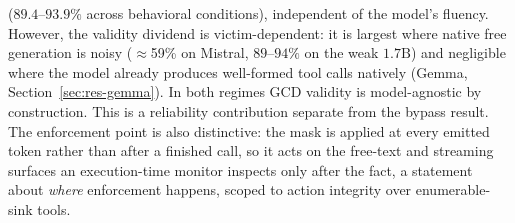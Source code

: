 (\(89.4\)--\(93.9\%\) across behavioral conditions), independent of the model's fluency. However, the validity dividend is victim-dependent: it is largest where native free generation is noisy (\(\approx\)59\% on Mistral, \(89\)--\(94\%\) on the weak \(1.7\mathrm{B}\)) and negligible where the model already produces well-formed tool calls natively (Gemma, Section~\ref{sec:res-gemma}). In both regimes GCD validity is model-agnostic by construction. This is a reliability contribution separate from the bypass result. The enforcement point is also distinctive: the mask is applied at every emitted token rather than after a finished call, so it acts on the free-text and streaming surfaces an execution-time monitor inspects only after the fact, a statement about \emph{where} enforcement happens, scoped to action integrity over enumerable-sink tools.

